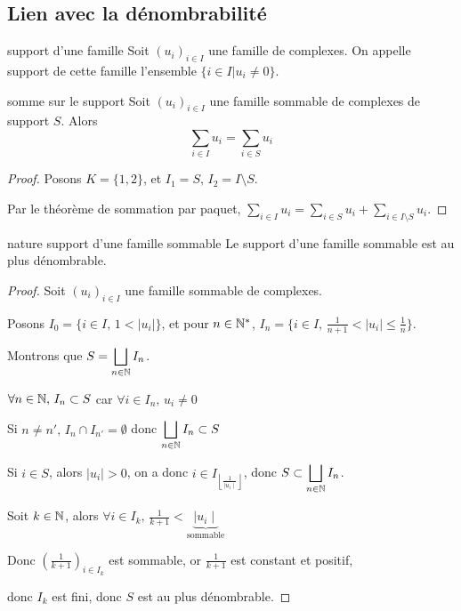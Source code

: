 \subsection{Lien avec la dénombrabilité }

\begin{definition}{support d'une famille}{}
    Soit $(u_i)_{i \in I}$ une famille de complexes. On appelle support de cette 
    famille l'ensemble $\{ i \in I | u_i \neq 0 \}$.
\end{definition}

\begin{proposition}{somme sur le support}{}
    Soit $(u_i)_{i \in I}$ une famille sommable de complexes de support $S$. Alors 
    $$\sum_{i \in I} u_i = \sum_{i \in S} u_i$$

\end{proposition}


\begin{proof}
    Posons $K = \{1, 2\}$, et $I_1 = S, \, I_2 = I \setminus S$.

    Par le théorème de sommation par paquet, $\displaystyle \sum_{i \in I} u_i = \sum_{i \in S} u_i + \sum_{i \in I \setminus S} u_i$.
\end{proof}

\begin{theoreme}{nature support d'une famille sommable}{}
    Le support d'une famille sommable est au plus dénombrable. 
\end{theoreme}

\begin{proof}
    Soit $(u_i)_{i \in I}$ une famille sommable de complexes. 

    Posons $I_0 = \{ i \in I, \, 1 < \mid u_i \mid \}$, et pour $n \in \mathbb{N}^*$,
    $I_n = \{ i \in I, \, \frac 1 {n + 1} < \mid u_i \mid \leqslant \frac 1 n \}$.

    Montrons que $\displaystyle S = \bigsqcup_{n \in \mathbb{N}} I_n$. 

    $\forall n \in \mathbb{N}, \, I_n \subset S$ car $\forall i \in I_n, \, u_i \neq 0$

    Si $n \neq n', \, I_n \cap I_{n'} = \emptyset$ donc $\displaystyle \bigsqcup_{n \in \mathbb{N}} I_n \subset S$

    Si $i \in S$, alors $\mid u_i \mid > 0$, on a donc $\displaystyle i \in I_{\left\lfloor \frac 1 {\mid u_i \mid} \right\rfloor}$, 
    donc $S \subset \displaystyle \bigsqcup_{n \in \mathbb{N}} I_n$.

    Soit $k \in \mathbb{N}$, alors $\forall i \in I_k, \, \frac 1 {k + 1} < \underbrace{\mid u_i \mid}_{\text{sommable}}$

    Donc $\left( \frac 1 {k + 1} \right)_{i \in I_k}$ est sommable, or $\frac 1 {k + 1}$ est constant et positif, 

    donc $I_k$ est fini, donc $S$ est au plus dénombrable.
\end{proof}

